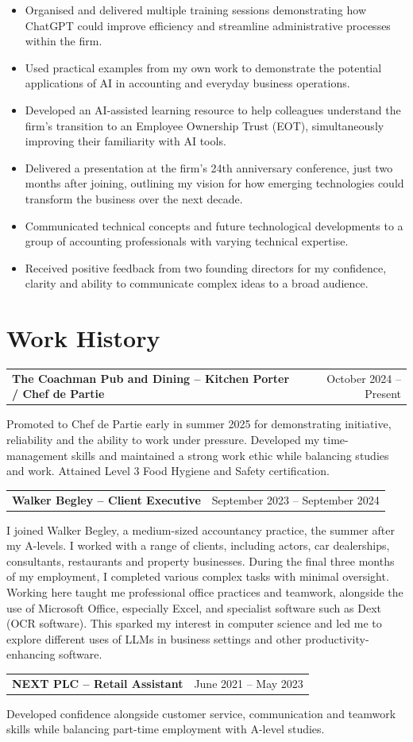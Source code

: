 \documentclass[11pt,a4paper]{article}
\makeatletter
\newcommand{\datedheading}[2]{%
 \noindent\begin{tabularx}{\linewidth}{@{}>{\raggedright\arraybackslash}X>{\raggedleft\arraybackslash}r@{}}
 \textbf{#1} & {\small\color{muted}#2}
 \end{tabularx}\par
}
\newcommand{\projectheading}[1]{\needspace{5\baselineskip}\vspace{3pt}{\bfseries #1}\par\vspace{-1pt}}
\newcommand{\workheading}[2]{\needspace{4\baselineskip}\vspace{4pt}\datedheading{#1}{#2}\vspace{1pt}}
\makeatother
\begin{document}
\newpage
\projectheading{AI Integration \& Workplace Efficiency -- Walker Begley}
\begin{itemize}
 \item Organised and delivered multiple training sessions demonstrating how ChatGPT could improve efficiency and streamline administrative processes within the firm.
 \item Used practical examples from my own work to demonstrate the potential applications of AI in accounting and everyday business operations.
 \item Developed an AI-assisted learning resource to help colleagues understand the firm's transition to an Employee Ownership Trust (EOT), simultaneously improving their familiarity with AI tools.
\end{itemize}

\projectheading{Technology \& Innovation Presentation -- Walker Begley}
\begin{itemize}
 \item Delivered a presentation at the firm's 24th anniversary conference, just two months after joining, outlining my vision for how emerging technologies could transform the business over the next decade.
 \item Communicated technical concepts and future technological developments to a group of accounting professionals with varying technical expertise.
 \item Received positive feedback from two founding directors for my confidence, clarity and ability to communicate complex ideas to a broad audience.
\end{itemize}

\section*{Work History}
\workheading{The Coachman Pub and Dining -- Kitchen Porter / Chef de Partie}{October 2024 -- Present}
Promoted to Chef de Partie early in summer 2025 for demonstrating initiative, reliability and the ability to work under pressure. Developed my time-management skills and maintained a strong work ethic while balancing studies and work. Attained Level 3 Food Hygiene and Safety certification.

\workheading{Walker Begley -- Client Executive}{September 2023 -- September 2024}
I joined Walker Begley, a medium-sized accountancy practice, the summer after my A-levels. I worked with a range of clients, including actors, car dealerships, consultants, restaurants and property businesses. During the final three months of my employment, I completed various complex tasks with minimal oversight. Working here taught me professional office practices and teamwork, alongside the use of Microsoft Office, especially Excel, and specialist software such as Dext (OCR software). This sparked my interest in computer science and led me to explore different uses of LLMs in business settings and other productivity-enhancing software.

\workheading{NEXT PLC -- Retail Assistant}{June 2021 -- May 2023}
Developed confidence alongside customer service, communication and teamwork skills while balancing part-time employment with A-level studies.
\end{document}
